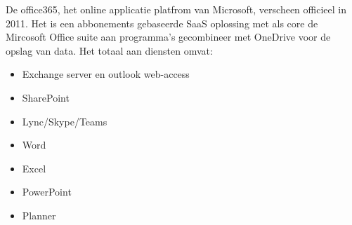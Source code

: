 De office365, het online applicatie platfrom van Microsoft, verscheen officieel in 2011. Het is een abbonements gebaseerde SaaS oplossing met als core de Mircosoft Office suite aan programma's gecombineer met OneDrive voor de opslag van data. Het totaal aan diensten omvat:
\begin{itemize}
	\item Exchange server en outlook web-access
	\item SharePoint
	\item Lync/Skype/Teams
	\item Word
	\item Excel
	\item PowerPoint
	\item Planner
\end{itemize}
